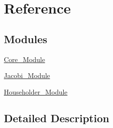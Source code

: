 \hypertarget{group___dense_matrix_manipulation___reference}{}\section{Reference}
\label{group___dense_matrix_manipulation___reference}
\subsection*{Modules}
\begin{DoxyCompactItemize}
\item 
\hyperlink{group___core___module}{Core\+\_\+\+Module}
\item 
\hyperlink{group___jacobi___module}{Jacobi\+\_\+\+Module}
\item 
\hyperlink{group___householder___module}{Householder\+\_\+\+Module}
\end{DoxyCompactItemize}


\subsection{Detailed Description}
